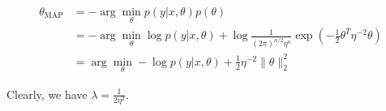 \begin{answer}
    $$
    \begin{aligned}
\theta_{\text{MAP}} &= -\arg \min_\theta p(y|x, \theta)p(\theta)\\
        &= -\arg \min _\theta \log p(y|x, \theta) + \log \frac{1}{(2\pi)^{n/2}\eta^n}\exp(-\frac{1}{2}\theta^T\eta^{-2} \theta )\\
        &= \arg\min_\theta -\log p(y|x, \theta) + \frac{1}{2}\eta^{-2}\|\theta\|_2^2
\end{aligned}
$$

    Clearly, we have $\lambda = \frac{1}{2\eta^2}$.
\end{answer}
